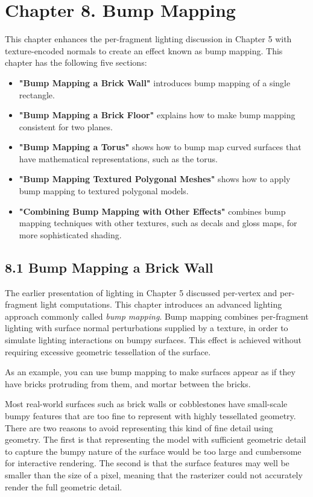 \documentclass[../main.tex]{subfiles}
\begin{document}
\chapter{Chapter 8. Bump Mapping}

This chapter enhances the per-fragment lighting discussion in Chapter 5 with texture-encoded normals to create an effect known as bump mapping. This chapter has the following five sections:

\begin{itemize}
\item \textbf{"Bump Mapping a Brick Wall"} introduces bump mapping of a single rectangle.
\item \textbf{"Bump Mapping a Brick Floor"} explains how to make bump mapping consistent for two planes.
\item \textbf{"Bump Mapping a Torus"} shows how to bump map curved surfaces that have mathematical representations, such as the torus.
\item \textbf{"Bump Mapping Textured Polygonal Meshes"} shows how to apply bump mapping to textured polygonal models.
\item \textbf{"Combining Bump Mapping with Other Effects"} combines bump mapping techniques with other textures, such as decals and gloss maps, for more sophisticated shading.
\end{itemize}

\section{8.1 Bump Mapping a Brick Wall}

The earlier presentation of lighting in Chapter 5 discussed per-vertex and per-fragment light computations. This chapter introduces an advanced lighting approach commonly called \textit{bump mapping}. Bump mapping combines per-fragment lighting with surface normal perturbations supplied by a texture, in order to simulate lighting interactions on bumpy surfaces. This effect is achieved without requiring excessive geometric tessellation of the surface.

As an example, you can use bump mapping to make surfaces appear as if they have bricks protruding from them, and mortar between the bricks.

Most real-world surfaces such as brick walls or cobblestones have small-scale bumpy features that are too fine to represent with highly tessellated geometry. There are two reasons to avoid representing this kind of fine detail using geometry. The first is that representing the model with sufficient geometric detail to capture the bumpy nature of the surface would be too large and cumbersome for interactive rendering. The second is that the surface features may well be smaller than the size of a pixel, meaning that the rasterizer could not accurately render the full geometric detail.
\end{document}
